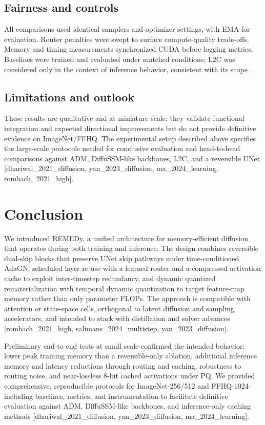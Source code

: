 \documentclass{article}
\begin{document}
\subsection{Fairness and controls}
All comparisons used identical samplers and optimizer settings, with EMA for evaluation. Router penalties were swept to surface compute-quality trade-offs. Memory and timing measurements synchronized CUDA before logging metrics. Baselines were trained and evaluated under matched conditions; L2C was considered only in the context of inference behavior, consistent with its scope \cite{ma_2024_learning}.

\subsection{Limitations and outlook}
These results are qualitative and at miniature scale; they validate functional integration and expected directional improvements but do not provide definitive evidence on ImageNet/FFHQ. The experimental setup described above specifies the large-scale protocols needed for conclusive evaluation and head-to-head comparisons against ADM, DiffuSSM-like backbones, L2C, and a reversible UNet [dhariwal_2021_diffusion, yan_2023_diffusion, ma_2024_learning, rombach_2021_high].

\section{Conclusion}
We introduced REMEDy, a unified architecture for memory-efficient diffusion that operates during both training and inference. The design combines reversible dual-skip blocks that preserve UNet skip pathways under time-conditioned AdaGN, scheduled layer re-use with a learned router and a compressed activation cache to exploit inter-timestep redundancy, and dynamic quantized rematerialization with temporal dynamic quantization to target feature-map memory rather than only parameter FLOPs. The approach is compatible with attention or state-space cells, orthogonal to latent diffusion and sampling accelerators, and intended to stack with distillation and solver advances [rombach_2021_high, salimans_2024_multistep, yan_2023_diffusion].

Preliminary end-to-end tests at small scale confirmed the intended behavior: lower peak training memory than a reversible-only ablation, additional inference memory and latency reductions through routing and caching, robustness to routing noise, and near-lossless 8-bit cached activations under PQ. We provided comprehensive, reproducible protocols for ImageNet-256/512 and FFHQ-1024-including baselines, metrics, and instrumentation-to facilitate definitive evaluation against ADM, DiffuSSM-like backbones, and inference-only caching methods [dhariwal_2021_diffusion, yan_2023_diffusion, ma_2024_learning].
\end{document}
